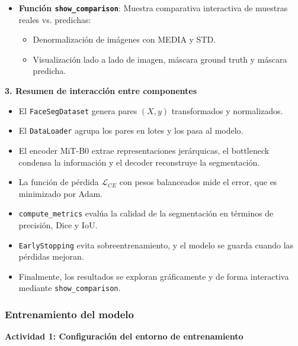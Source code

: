 \begin{itemize}
  \item \textbf{Función \texttt{show\_comparison}}:  
    Muestra comparativa interactiva de muestras reales vs. predichas:
    \begin{itemize}
      \item Denormalización de imágenes con MEDIA y STD.
      \item Visualización lado a lado de imagen, máscara ground truth y máscara predicha.
    \end{itemize}
\end{itemize}

\textbf{3. Resumen de interacción entre componentes}
\begin{itemize}
  \item El \texttt{FaceSegDataset} genera pares \((X, y)\) transformados y normalizados.
  \item El \texttt{DataLoader} agrupa los pares en lotes y los pasa al modelo.
  \item El encoder MiT-B0 extrae representaciones jerárquicas, el bottleneck condensa la información y el decoder reconstruye la segmentación.
  \item La función de pérdida \(\mathcal{L}_{CE}\) con pesos balanceados mide el error, que es minimizado por Adam.
  \item \texttt{compute\_metrics} evalúa la calidad de la segmentación en términos de precisión, Dice y IoU.
  \item \texttt{EarlyStopping} evita sobreentrenamiento, y el modelo se guarda cuando las pérdidas mejoran.
  \item Finalmente, los resultados se exploran gráficamente y de forma interactiva mediante \texttt{show\_comparison}.
\end{itemize}

\subsubsection{Entrenamiento del modelo}
\textbf{Actividad 1: Configuración del entorno de entrenamiento}

